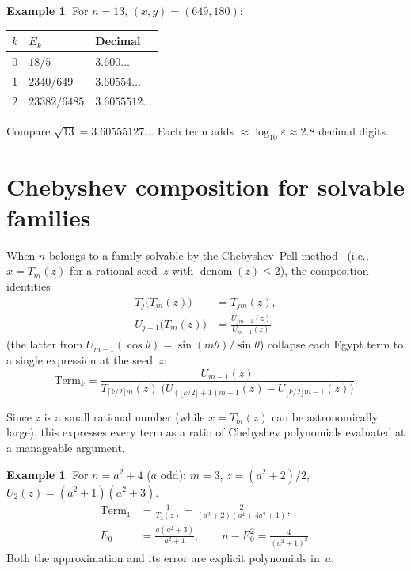 \documentclass[11pt]{article}
\theoremstyle{definition}
\newtheorem{example}[theorem]{Example}
\theoremstyle{remark}
\begin{document}
\begin{example}
For $n = 13$, $(x,y) = (649, 180)$:
\begin{center}
\begin{tabular}{cll}
\toprule
$k$ & $E_k$ & Decimal \\
\midrule
$0$ & $18/5$     & $3.600\ldots$ \\
$1$ & $2340/649$ & $3.60554\ldots$ \\
$2$ & $23382/6485$ & $3.6055512\ldots$ \\
\bottomrule
\end{tabular}
\end{center}
Compare $\sqrt{13} = 3.60555127\ldots$\;
Each term adds $\approx \log_{10}\varepsilon \approx 2.8$ decimal digits.
\end{example}

\section{Chebyshev composition for solvable families}

When $n$ belongs to a family solvable by the Chebyshev--Pell
method~\cite{PopelkaPellTower2025}
(i.e., $x = T_m(z)$ for a rational seed~$z$ with
$\operatorname{denom}(z) \le 2$), the composition identities
\begin{align}
T_j\bigl(T_m(z)\bigr) &= T_{jm}(z), \label{eq:Tcomp} \\[3pt]
U_{j-1}\bigl(T_m(z)\bigr) &= \frac{U_{jm-1}(z)}{U_{m-1}(z)}
\label{eq:Ucomp}
\end{align}
(the latter from $U_{m-1}(\cos\theta) = \sin(m\theta)/\sin\theta$)
collapse each Egypt term to a single expression at the seed~$z$:
\begin{equation}\label{eq:termcollapse}
\text{Term}_k
= \frac{U_{m-1}(z)}{
  T_{\lceil k/2\rceil m}(z)\;\bigl(
    U_{(\lfloor k/2\rfloor+1)m-1}(z)
  - U_{\lfloor k/2\rfloor m - 1}(z)\bigr)}.
\end{equation}

Since $z$ is a small rational number (while $x = T_m(z)$ can be
astronomically large), this expresses every term as a ratio of
Chebyshev polynomials evaluated at a manageable argument.

\begin{example}
For $n = a^2 + 4$ ($a$ odd): $m = 3$, $z = (a^2+2)/2$,
$U_2(z) = (a^2+1)(a^2+3)$.
\begin{align*}
\mathrm{Term}_1 &= \frac{1}{T_3(z)}
  = \frac{2}{(a^2+2)(a^4+4a^2+1)}, \\[3pt]
E_0 &= \frac{a(a^2+3)}{a^2+1}, \qquad
n - E_0^2 = \frac{4}{(a^2+1)^2}.
\end{align*}
Both the approximation and its error are explicit polynomials in~$a$.
\end{example}
\end{document}
